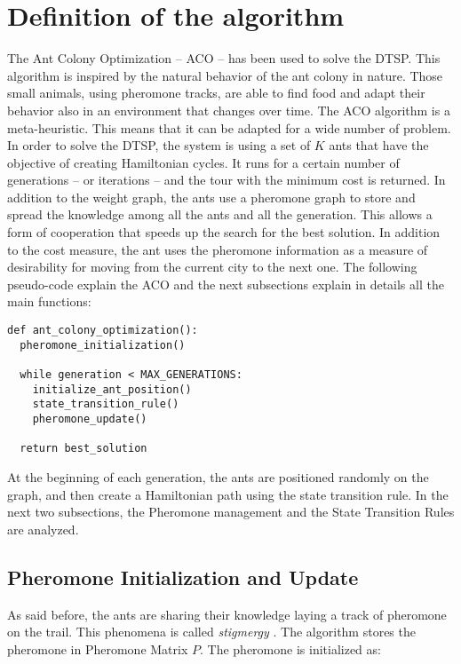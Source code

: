 \documentclass[a4paper,9pt,journal,twoside,compsoc]{PPIEEEtran}
\begin{document}

\section{Definition of the algorithm}
The Ant Colony Optimization \cite{ant1} -- ACO -- has been used to solve the DTSP. This algorithm is inspired by the natural behavior of the ant colony in nature. Those small animals, using pheromone tracks, are able to find food and adapt their behavior also in an environment that changes over time.
The ACO algorithm is a meta-heuristic. This means that it can be adapted for a wide number of problem. In order to solve the DTSP, the system is using a set of $K$ ants that have the objective of creating Hamiltonian cycles. It runs for a certain number of generations -- or iterations -- and the tour with the minimum cost is returned. In addition to the weight graph, the ants use a pheromone graph to store and spread the knowledge among all the ants and all the generation. This allows a form of cooperation that speeds up the search for the best solution. In addition to the cost measure, the ant uses the pheromone information as a measure of desirability for moving from the current city to the next one.
The following pseudo-code explain the ACO and the next subsections explain in details all the main functions:

\begin{lstlisting}[basicstyle=\scriptsize \ttfamily]
def ant_colony_optimization():
  pheromone_initialization()

  while generation < MAX_GENERATIONS:
    initialize_ant_position()
    state_transition_rule()
    pheromone_update()
	
  return best_solution
\end{lstlisting}

At the beginning of each generation, the ants are positioned randomly on the graph, and then create a Hamiltonian path using the state transition rule. In the next two subsections, the Pheromone management and the State Transition Rules are analyzed.


\subsection{Pheromone Initialization and Update}
As said before, the ants are sharing their knowledge laying a track of pheromone on the trail. This phenomena is called \textit{stigmergy} \cite{stigmergy}. The algorithm stores the pheromone in Pheromone Matrix $P$. The pheromone is initialized as:
\end{document}
